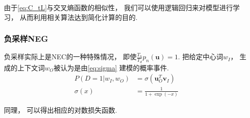 由于\cref{eq:C_tL}与交叉熵函数的相似性，
我们可以使用逻辑回归来对模型进行学习，
从而利用相关算法达到简化计算的目的.

\subsubsection{负采样NEG}

负采样实际上是NEC的一种特殊情况，
即使$\frac{T_n}{T_d}p_n\left(\mathbf{u}\right)=1$.
把给定中心词$w_I$，
生成的上下文词$w_O$被认为是由\cref{eq:sigma}
建模的概率事件.
\begin{equation}
    \label{eq:sigma}
    \begin{aligned}
        P\left(D=1|w_I,w_O\right) & = \sigma\left(\mathbf{u}_O^T\mathbf{v}_I\right) \\
        \sigma(x)                 & =\frac{1}{1+\exp(-x)}
    \end{aligned}
\end{equation}

同理，
可以得出相应的对数损失函数.
